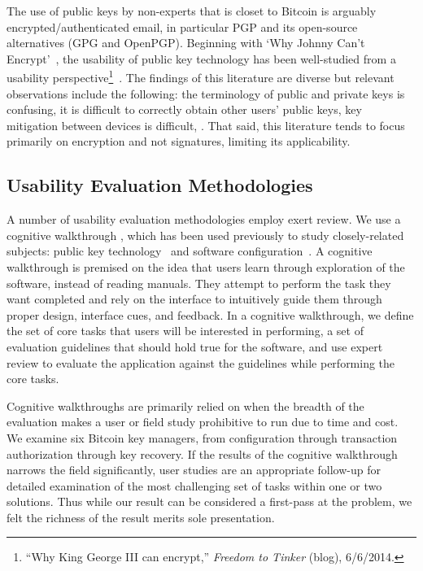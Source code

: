 The use of public keys by non-experts that is closet to Bitcoin is arguably encrypted/authenticated email, in particular PGP and its open-source alternatives (\ie GPG and OpenPGP). Beginning with `Why Johnny Can't Encrypt'~\cite{WT99}, the usability of public key technology has been well-studied from a usability perspective\footnote{``Why King George III can encrypt,'' \textit{Freedom to Tinker} (blog), 6/6/2014.}~\cite{GM05,GMSN+05,SBKH06,GFF06}. The findings of this literature are diverse but relevant observations include the following: the terminology of public and private keys is confusing, it is difficult to correctly obtain other users' public keys, key mitigation between devices is difficult, \etc. That said, this literature tends to focus primarily on encryption and not signatures, limiting its applicability.

\subsection{Usability Evaluation Methodologies}

A number of usability evaluation methodologies employ exert review. We use a cognitive walkthrough \cite{WRLP94}, which has been used previously to study closely-related subjects: public key technology~\cite{WT99} and software configuration~\cite{COA07}. A cognitive walkthrough is premised on the idea that users learn through exploration of the software, instead of reading manuals. They attempt to perform the task they want completed and rely on the interface to intuitively guide them through proper design, interface cues, and feedback. In a cognitive walkthrough, we define the set of core tasks that users will be interested in performing, a set of evaluation guidelines that should hold true for the software, and use expert review to evaluate the application against the guidelines while performing the core tasks. 

Cognitive walkthroughs are primarily relied on when the breadth of the evaluation makes a user or field study prohibitive to run due to time and cost. We examine six Bitcoin key managers, from configuration through transaction authorization through key recovery. If the results of the cognitive walkthrough narrows the field significantly, user studies are an appropriate follow-up for detailed examination of the most challenging set of tasks within one or two solutions. Thus while our result can be considered a first-pass at the problem, we felt the richness of the result merits sole presentation.

